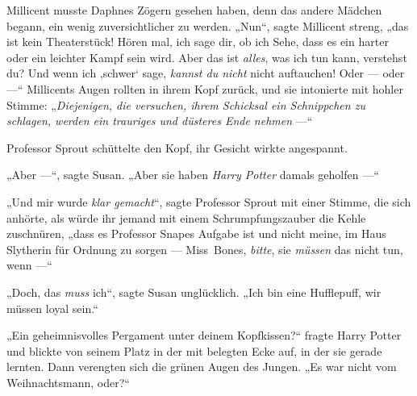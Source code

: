 Millicent musste Daphnes Zögern gesehen haben, denn das andere Mädchen begann, ein wenig zuversichtlicher zu werden.
„Nun“, sagte Millicent streng, „das ist kein Theaterstück! Hören mal, ich sage dir, ob ich Sehe, dass es ein harter oder ein leichter Kampf sein wird. Aber das ist \emph{alles}, was ich tun kann, verstehst du? Und wenn ich ‚schwer‘ sage, \emph{kannst du nicht} nicht auftauchen! Oder — oder —“ Millicents Augen rollten in ihrem Kopf zurück, und sie intonierte mit hohler Stimme:
„\emph{Diejenigen, die versuchen, ihrem Schicksal ein Schnippchen zu schlagen, werden ein trauriges und düsteres Ende nehmen} —“

\later

Professor Sprout schüttelte den Kopf, ihr Gesicht wirkte angespannt.

„Aber —“, sagte Susan.
„Aber sie haben \emph{Harry Potter} damals geholfen —“

„Und mir wurde \emph{klar gemacht}“, sagte Professor Sprout mit einer Stimme, die sich anhörte, als würde ihr jemand mit einem Schrumpfungszauber die Kehle zuschnüren, „dass es Professor Snapes Aufgabe ist und nicht meine, im Haus Slytherin für Ordnung zu sorgen — Miss~Bones, \emph{bitte}, sie \emph{müssen} das nicht tun, wenn —“

„Doch, das \emph{muss} ich“, sagte Susan unglücklich.
„Ich bin eine Hufflepuff, wir müssen loyal sein.“

\later

„Ein geheimnisvolles Pergament unter deinem Kopfkissen?“ fragte Harry Potter und blickte von seinem Platz in der mit  belegten Ecke auf, in der sie gerade lernten. Dann verengten sich die grünen Augen des Jungen.
„Es war nicht vom Weihnachtsmann, oder?“

